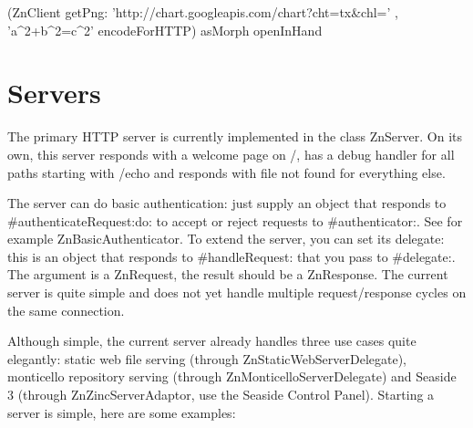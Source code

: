 \documentclass[a4paper,10pt,twoside]{book}
\begin{document}
\begin{code}{}
(ZnClient getPng: 'http://chart.googleapis.com/chart?cht=tx&chl=' ,
'a^2+b^2=c^2' encodeForHTTP) asMorph openInHand
\end{code}

%




\section{Servers}

The primary HTTP server is currently implemented in the class ZnServer. On its own, this server responds with a welcome page on /, has a debug handler for all paths starting with /echo and responds with file not found for everything else.

The server can do basic authentication: just supply an object that responds to #authenticateRequest:do: to accept or reject requests to #authenticator:. See for example ZnBasicAuthenticator. To extend the server, you can set its delegate: this is an object that responds to #handleRequest: that you pass to #delegate:. The argument is a ZnRequest, the result should be a ZnResponse. The current server is quite simple and does not yet handle multiple request/response cycles on the same connection.

Although simple, the current server already handles three use cases quite elegantly: static web file serving (through ZnStaticWebServerDelegate), monticello repository serving (through ZnMonticelloServerDelegate) and Seaside 3 (through ZnZincServerAdaptor, use the Seaside Control Panel). Starting a server is simple, here are some examples:
\end{document}
